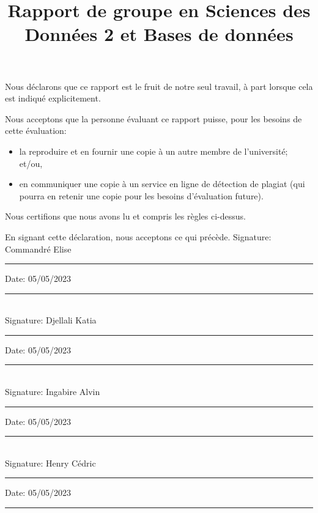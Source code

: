 \documentclass[mstat,12pt]{unswthesis}
\title{Rapport de groupe en Sciences des Données 2 et Bases de données}
\author{\Authornameonly}
\begin{document}
\beforepreface




\vskip 2pc \noindent Nous déclarons que ce rapport est le fruit de notre seul travail, à part lorsque cela est indiqué  explicitement. 

\vskip 2pc  \noindent Nous acceptons que la personne évaluant ce rapport puisse, pour les besoins de cette évaluation:
\begin{itemize}
\item la reproduire et en fournir une copie à un autre membre de l'université; et/ou,
\item en communiquer une copie à un service en ligne de détection de plagiat (qui pourra en retenir une copie pour les besoins d'évaluation future).
\end{itemize}

\vskip 2pc \noindent Nous certifions que nous avons lu et compris les règles ci-dessus.\vspace{24pt}

\vskip 2pc \noindent En signant cette déclaration, nous acceptons ce qui précède.
\vskip 2pc \noindent
Signature: Commandré Elise \rule{7cm}{0.25pt} \hfill Date: 05/05/2023 \rule{4cm}{0.25pt} \\[1cm]
Signature: Djellali Katia\rule{7cm}{0.25pt} \hfill Date: 05/05/2023 \rule{4cm}{0.25pt} \\[1cm]
Signature: Ingabire Alvin\rule{7cm}{0.25pt} \hfill Date: 05/05/2023\rule{4cm}{0.25pt} \\[1cm]
Signature: Henry Cédric\rule{7cm}{0.25pt} \hfill Date: 05/05/2023\rule{4cm}{0.25pt} \\[1cm]
\vskip 1pc





\afterpreface





%
%




\end{document}
